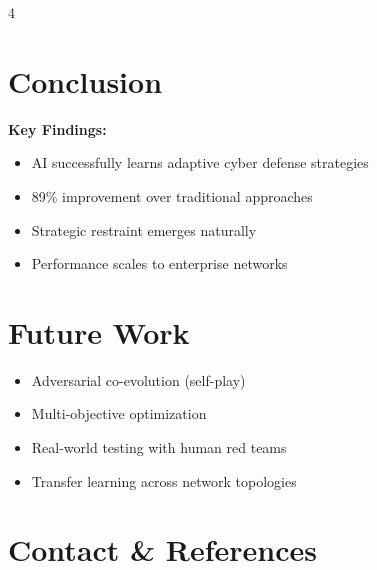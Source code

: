 \documentclass[landscape]{ImperialPoster}
\begin{document}
\begin{multicols}{4}
\section{Conclusion}

\textbf{Key Findings:}
\begin{itemize}
\item AI successfully learns adaptive cyber defense strategies
\item 89\% improvement over traditional approaches
\item Strategic restraint emerges naturally 
\item Performance scales to enterprise networks
\end{itemize}


\section{Future Work}
\begin{itemize}
\item Adversarial co-evolution (self-play)
\item Multi-objective optimization 
\item Real-world testing with human red teams
\item Transfer learning across network topologies
\end{itemize}

\section{Contact \& References}

\end{multicols}
\end{document}
